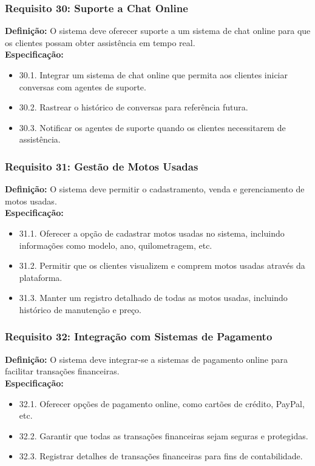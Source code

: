 \subsubsection{Requisito 30: Suporte a Chat Online}
\textbf{Definição:} O sistema deve oferecer suporte a um sistema de chat online para que os clientes possam obter assistência em tempo real.
\\
\textbf{Especificação:}
\begin{itemize}
	\item 30.1. Integrar um sistema de chat online que permita aos clientes iniciar conversas com agentes de suporte.
	\item 30.2. Rastrear o histórico de conversas para referência futura.
	\item 30.3. Notificar os agentes de suporte quando os clientes necessitarem de assistência.
\end{itemize}

\subsubsection{Requisito 31: Gestão de Motos Usadas}
\textbf{Definição:} O sistema deve permitir o cadastramento, venda e gerenciamento de motos usadas.
\\
\textbf{Especificação:}
\begin{itemize}
	\item 31.1. Oferecer a opção de cadastrar motos usadas no sistema, incluindo informações como modelo, ano, quilometragem, etc.
	\item 31.2. Permitir que os clientes visualizem e comprem motos usadas através da plataforma.
	\item 31.3. Manter um registro detalhado de todas as motos usadas, incluindo histórico de manutenção e preço.
\end{itemize}

\subsubsection{Requisito 32: Integração com Sistemas de Pagamento}
\textbf{Definição:} O sistema deve integrar-se a sistemas de pagamento online para facilitar transações financeiras.
\\
\textbf{Especificação:}
\begin{itemize}
	\item 32.1. Oferecer opções de pagamento online, como cartões de crédito, PayPal, etc.
	\item 32.2. Garantir que todas as transações financeiras sejam seguras e protegidas.
	\item 32.3. Registrar detalhes de transações financeiras para fins de contabilidade.
\end{itemize}

